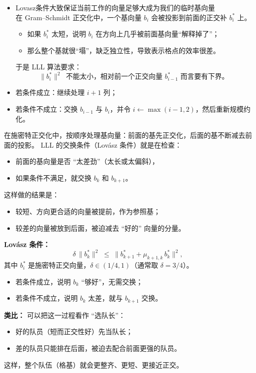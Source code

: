\begin{itemize}
\item Lovasz条件大致保证当前工作的向量足够大成为我们的临时基向量\\在 Gram--Schmidt 正交化中，一个基向量 $b_i$ 会被投影到前面的正交补 $b_i^*$ 上。
\begin{itemize}
  \item 如果 $b_i^*$ 太短，说明 $b_i$ 在方向上几乎被前面基向量“解释掉了”；
  \item 那么整个基就很“塌”，缺乏独立性，导致表示格点的效率很差。
\end{itemize}

于是 LLL 算法要求：
\[
\|b_i^*\|^2 \;\;\text{不能太小，相对前一个正交向量 } b_{i-1}^* \text{ 而言要有下界。}
\]
  \item 若条件成立：继续处理 $i+1$ 列；
  \item 若条件不成立：交换 $b_{i-1}$ 与 $b_i$，并令 $i \gets \max(i-1,2)$，然后重新规模约化。
\end{itemize}
\begin{proposition}
在施密特正交化中，按顺序处理基向量：前面的基先正交化，后面的基不断减去前面的投影。
LLL 的交换条件（Lovász 条件）就是在检查：

\begin{itemize}
    \item 前面的基向量是否 ``太差劲''（太长或太偏斜），
    \item 如果条件不满足，就交换 $b_k$ 和 $b_{k+1}$。
\end{itemize}

这样做的结果是：
\begin{itemize}
    \item 较短、方向更合适的向量被提前，作为参照基；
    \item 较差的向量被放到后面，被迫减去 ``好的'' 向量的分量。
\end{itemize}

\medskip
\textbf{Lovász 条件：}
\[
\delta \,\|b^*_k\|^2 \;\leq\; \|b^*_{k+1} + \mu_{k+1,k}\, b^*_k\|^2,
\]
其中 $b^*_i$ 是施密特正交向量，$\delta \in (1/4,1)$（通常取 $\delta=3/4$）。

\begin{itemize}
    \item 若条件成立，说明 $b_k$ ``够好''，无需交换；
    \item 若条件不成立，说明 $b_k$ 太差，就与 $b_{k+1}$ 交换。
\end{itemize}

\medskip
\textbf{类比：}  
可以把这一过程看作 ``选队长''：  
\begin{itemize}
    \item 好的队员（短而正交性好）先当队长；  
    \item 差的队员只能排在后面，被迫去配合前面更强的队员。  
\end{itemize}

这样，整个队伍（格基）就会更整齐、更短、更接近正交。
\end{proposition}
